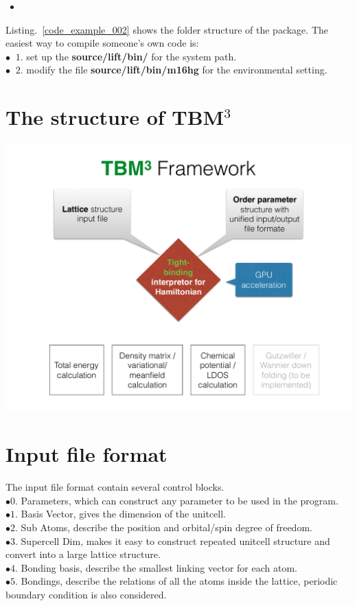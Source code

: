 \documentclass{article}
\newcommand{\codescript}[2]{
\begin{itemize}
\item[]
\end{itemize}
}
\begin{document}
\codescript{code_example_002}{The folder structure of the package}

Listing.~\ref{code_example_002} shows the folder structure of the package.
The easiest way to compile someone's own code is:\\
$\bullet\;\; 1. $ set up the {\bf source/lift/bin/} for the system path.\\
$\bullet\;\; 2. $ modify the file {\bf source/lift/bin/m16hg} for the environmental setting.\\

\section{The structure of TBM$^{3}$}

\begin{center}
\includegraphics[scale=0.5]{fig01.pdf}
\end{center}

\section{Input file format}

The input file format contain several control blocks.\\
$\bullet 0.$ Parameters, which can construct any parameter to be used in the program.\\
$\bullet 1.$ Basis Vector, gives the dimension of the unitcell.\\
$\bullet 2.$ Sub Atoms, describe the position and orbital/spin degree of freedom.\\
$\bullet 3.$ Supercell Dim, makes it easy to construct repeated unitcell structure and convert into a large lattice structure.\\
$\bullet 4.$ Bonding basis, describe the smallest linking vector for each atom.\\
$\bullet 5.$ Bondings, describe the relations of all the atoms inside the lattice, periodic boundary condition is also considered.
\end{document}
